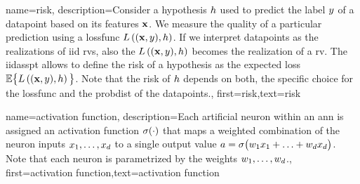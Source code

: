 {name={risk},
	description={Consider a \gls{hypothesis} $h$ used to predict the \gls{label} 
		$y$ of a \gls{datapoint} based on its \gls{feature}s ${\bf x}$. We measure 
		the quality of a particular \gls{prediction} using a \gls{lossfunc} $L\left(({\bf x},y),h \right)$. 
		If we interpret \gls{datapoint}s as the \gls{realization}s of \gls{iid} \gls{rv}s, 
		also the $L\left(({\bf x},y),h \right)$ becomes the \gls{realization} 
		of a \gls{rv}. The \gls{iidasspt} allows to define the risk of a \gls{hypothesis} 
		as the expected \gls{loss} $\mathbb{E} \big\{L\left(({\bf x},y),h \right) \big\}$. 
		Note that the risk of $h$ depends on both, the specific choice for the \gls{lossfunc} and the 
		\gls{probdist} of the \gls{datapoint}s.},
	first={risk},text={risk} 
}

{name={activation function},
	description={Each artificial neuron within an \gls{ann} is 
		assigned an activation function $\sigma(\cdot)$ that maps a weighted combination of 
		the neuron inputs $x_{1},\ldots,x_{d}$ to a single output 
		value $a = \sigma\big(w_{1} x_{1}+\ldots+w_{d} x_{d} \big)$. 
		Note that each neuron is parametrized by the weights $w_{1},\ldots,w_{d}$.},
first={activation function},text={activation function} 
}





